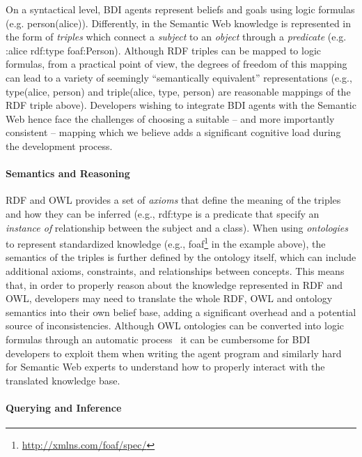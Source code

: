 \documentclass[
]{ceurart}
\begin{document}
On a syntactical level, \ac{BDI} agents represent beliefs and goals using logic formulas
(e.g. \textsf{person(alice)}).
%
Differently, in the Semantic Web knowledge is represented in the form of \emph{triples} which connect a \emph{subject} to an \emph{object} through a \emph{predicate} (e.g. \textsf{:alice rdf:type foaf:Person}).
%
Although \ac{RDF} triples can be mapped to logic formulas, from a practical point of view, the degrees of freedom of this mapping can lead to a variety of seemingly ``semantically equivalent'' representations (e.g., \textsf{type(alice, person)} and \textsf{triple(alice, type, person)} are reasonable mappings of the \ac{RDF} triple above).
%
Developers wishing to integrate \ac{BDI} agents with the Semantic Web hence face the challenges of choosing a suitable -- and more importantly consistent -- mapping which we believe adds a significant cognitive load during the development process.

\paragraph{Semantics and Reasoning}
\ac{RDF} and \ac{OWL} provides a set of \emph{axioms} that define the meaning of the triples and how they can be inferred (e.g., \textsf{rdf:type} is a predicate that specify an \emph{instance of} relationship between the subject and a class).
%
When using \emph{ontologies} to represent standardized knowledge (e.g., \textsf{foaf}\footnote{\url{http://xmlns.com/foaf/spec/}} in the example above), 
the semantics of the triples is further defined by the ontology itself,
which can include additional axioms, constraints, and relationships between concepts.
%
This means that, in order to properly reason about the knowledge represented in \ac{RDF} and \ac{OWL},
developers may need to translate the whole \ac{RDF}, \ac{OWL} and ontology semantics into their own belief base, adding a significant overhead and a potential source of inconsistencies. 
Although \ac{OWL} ontologies can be converted into logic formulas through an automatic process~\cite{samuel2008tplp}
it can be cumbersome for \ac{BDI} developers to exploit them when writing the agent program
and similarly hard for Semantic Web experts to understand how to properly interact with the translated knowledge base.

\paragraph{Querying and Inference}
\end{document}
